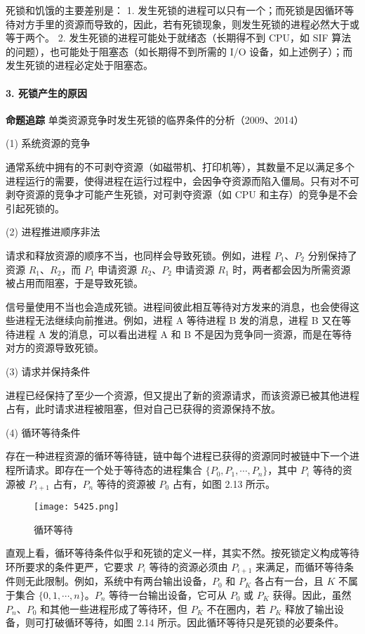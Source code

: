 \documentclass{ctexbook}
\begin{document}
死锁和饥饿的主要差别是：
1. 发生死锁的进程可以只有一个；而死锁是因循环等待对方手里的资源而导致的，因此，若有死锁现象，则发生死锁的进程必然大于或等于两个。
2. 发生死锁的进程可能处于就绪态（长期得不到 CPU，如 SIF 算法的问题），也可能处于阻塞态（如长期得不到所需的 I/O 设备，如上述例子）；而发生死锁的进程必定处于阻塞态。

\paragraph{3. 死锁产生的原因}

\textbf{命题追踪} 单类资源竞争时发生死锁的临界条件的分析（2009、2014）

(1) 系统资源的竞争

通常系统中拥有的不可剥夺资源（如磁带机、打印机等），其数量不足以满足多个进程运行的需要，使得进程在运行过程中，会因争夺资源而陷入僵局。只有对不可剥夺资源的竞争才可能产生死锁，对可剥夺资源（如 CPU 和主存）的竞争是不会引起死锁的。

(2) 进程推进顺序非法

请求和释放资源的顺序不当，也同样会导致死锁。例如，进程 $P_1$、$P_2$ 分别保持了资源 $R_1$、$R_2$，而 $P_1$ 申请资源 $R_2$、$P_2$ 申请资源 $R_1$ 时，两者都会因为所需资源被占用而阻塞，于是导致死锁。

信号量使用不当也会造成死锁。进程间彼此相互等待对方发来的消息，也会使得这些进程无法继续向前推进。例如，进程 A 等待进程 B 发的消息，进程 B 又在等待进程 A 发的消息，可以看出进程 A 和 B 不是因为竞争同一资源，而是在等待对方的资源导致死锁。

(3) 请求并保持条件

进程已经保持了至少一个资源，但又提出了新的资源请求，而该资源已被其他进程占有，此时请求进程被阻塞，但对自己已获得的资源保持不放。

(4) 循环等待条件

存在一种进程资源的循环等待链，链中每个进程已获得的资源同时被链中下一个进程所请求。即存在一个处于等待态的进程集合 $\{P_0, P_1, \cdots, P_n\}$，其中 $P_i$ 等待的资源被 $P_{i+1}$ 占有，$P_n$ 等待的资源被 $P_0$ 占有，如图 2.13 所示。

\begin{figure}[h]
	\centering
	\texttt{[image: 5425.png]}
	\caption{循环等待}
	\label{fig:cycle_waiting}
\end{figure}

直观上看，循环等待条件似乎和死锁的定义一样，其实不然。按死锁定义构成等待环所要求的条件更严，它要求 $P_i$ 等待的资源必须由 $P_{i+1}$ 来满足，而循环等待条件则无此限制。例如，系统中有两台输出设备，$P_0$ 和 $P_K$ 各占有一台，且 $K$ 不属于集合 $\{0, 1, \cdots, n\}$。$P_n$ 等待一台输出设备，它可从 $P_0$ 或 $P_K$ 获得。因此，虽然 $P_n$、$P_0$ 和其他一些进程形成了等待环，但 $P_K$ 不在圈内，若 $P_K$ 释放了输出设备，则可打破循环等待，如图 2.14 所示。因此循环等待只是死锁的必要条件。
\end{document}
